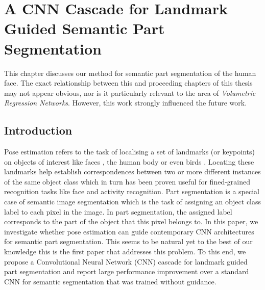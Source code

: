 \graphicspath{{chapter_seg/}}
\chapter{A CNN Cascade for Landmark Guided Semantic Part Segmentation}
\label{chapter:seg}

This chapter discusses our method for semantic part segmentation of
the human face. The exact relationship between this and proceeding
chapters of this thesis may not appear obvious, nor is it particularly
relevant to the area of \textit{Volumetric Regression
  Networks}. However, this work strongly influenced the future work.



\section{Introduction}

Pose estimation refers to the task of localising a set of landmarks
(or keypoints) on objects of interest like faces
\cite{cootes2001active}, the human body \cite{yang2011articulated} or
even birds \cite{zhang2015fine}. Locating these landmarks help
establish correspondences between two or more different instances of
the same object class which in turn has been proven useful for
fined-grained recognition tasks like face and activity
recognition. Part segmentation is a special case of semantic image
segmentation which is the task of assigning an object class label to
each pixel in the image. In part segmentation, the assigned label
corresponds to the part of the object that this pixel belongs to. In
this paper, we investigate whether pose estimation can guide
contemporary CNN architectures for semantic part segmentation. This
seems to be natural yet to the best of our knowledge this is the first
paper that addresses this problem. To this end, we propose a
Convolutional Neural Network (CNN) cascade for landmark guided part
segmentation and report large performance improvement over a standard
CNN for semantic segmentation that was trained without guidance.

